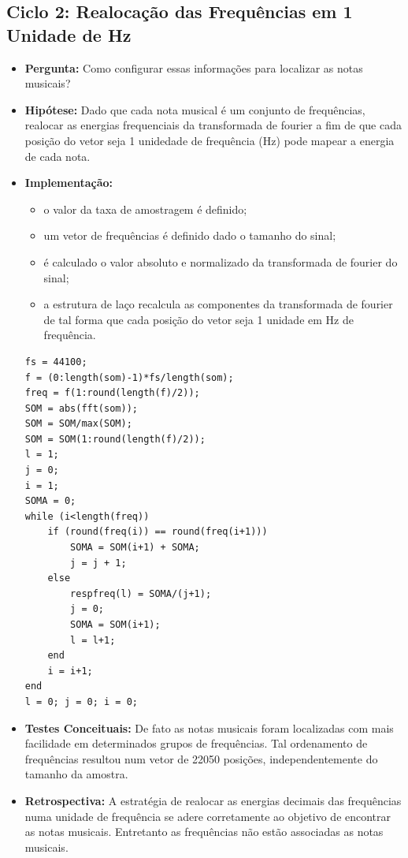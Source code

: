 \subsection{Ciclo 2: Realocação das Frequências em 1 Unidade de Hz}
\label{subsec:ciclo_2}
\begin{itemize}
\item \textbf{Pergunta:} Como configurar essas informações para localizar as notas musicais?
\item \textbf{Hipótese:} Dado que cada nota musical é um conjunto de frequências, realocar as energias frequenciais da transformada de fourier a fim de que cada posição do vetor seja 1 unidedade de frequência (Hz) pode mapear a energia de cada nota.
\item \textbf{Implementação:} 
\begin{itemize} 
	\item o valor da taxa de amostragem é definido;
	\item um vetor de frequências é definido dado o tamanho do sinal;
	\item é calculado o valor absoluto e normalizado da transformada de fourier do sinal;
	\item a estrutura de laço recalcula as componentes da transformada de fourier de tal forma que cada posição do vetor seja 1 unidade em Hz de frequência.
\end{itemize}
\begin{lstlisting}
fs = 44100;
f = (0:length(som)-1)*fs/length(som);
freq = f(1:round(length(f)/2));
SOM = abs(fft(som));
SOM = SOM/max(SOM);
SOM = SOM(1:round(length(f)/2));
l = 1;
j = 0;
i = 1;
SOMA = 0; 
while (i<length(freq))
    if (round(freq(i)) == round(freq(i+1)))
        SOMA = SOM(i+1) + SOMA;
        j = j + 1;
    else
        respfreq(l) = SOMA/(j+1);
        j = 0;
        SOMA = SOM(i+1);
        l = l+1;
    end
    i = i+1;
end
l = 0; j = 0; i = 0;
\end{lstlisting}
\item \textbf{Testes Conceituais:} De fato as notas musicais foram localizadas com mais facilidade em determinados grupos de frequências. Tal ordenamento de frequências resultou num vetor de 22050 posições, independentemente do tamanho da amostra.
\item \textbf{Retrospectiva:} A estratégia de realocar as energias decimais das frequências numa unidade de frequência se adere corretamente ao objetivo de encontrar as notas musicais. Entretanto as frequências não estão associadas as notas musicais.
\end{itemize}

